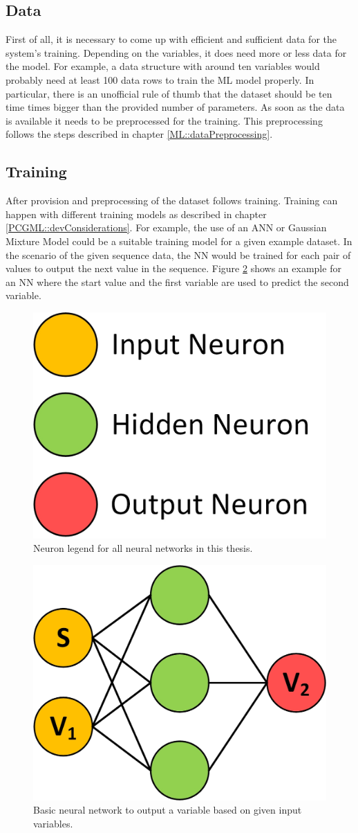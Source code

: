\documentclass[MGS,Master,english]{twbook}%
\begin{document}
\subsection{Data}
First of all, it is necessary to come up with efficient and sufficient data for the system’s training. Depending on the variables, it does need more or less data for the model. For example, a data structure with around ten variables would probably need at least 100 data rows to train the ML model properly. In particular, there is an unofficial rule of thumb that the dataset should be ten time times bigger than the provided number of parameters. As soon as the data is available it needs to be preprocessed for the training. This preprocessing follows the steps described in chapter \ref{ML::dataPreprocessing}.


\subsection{Training}
After provision and preprocessing of the dataset follows training. Training can happen with different training models as described in chapter \ref{PCGML::devConsiderations}. For example, the use of an ANN or Gaussian Mixture Model could be a suitable training model for a given example dataset. In the scenario of the given sequence data, the \ac{NN} would be trained for each pair of values to output the next value in the sequence. Figure \ref{fig::PCGML::devExample::NNbasic} shows an example for an \ac{NN} where the start value and the first variable are used to predict the second variable.
\begin{figure}[!htbp]
	\centering
	\includegraphics[width=0.25\linewidth]{PICs/NNs/neurons_legend.jpg}
	\caption{Neuron legend for all neural networks in this thesis.}\label{fig::neuron_legend}
\end{figure}
\begin{figure}[!htbp]
	\centering
	\includegraphics[width=0.3\linewidth]{PICs/NNs/PCGML_development_example_NN_basic}
	\caption{Basic neural network to output a variable based on given input variables.}\label{fig::PCGML::devExample::NNbasic}
\end{figure}
\end{document}
